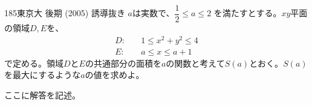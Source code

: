 \begin{thm}{185}{}{東京大 後期 (2005) 誘導抜き}
 $a$は実数で、$\dfrac{1}{2}\le a\le 2$ を満たすとする。$xy$平面の領域$D, E$を、
 \begin{align*}
  D:&\quad 1\le x^2+y^2 \le 4 \\
  E:&\quad a\le x \le a+1
 \end{align*}
 で定める。領域$D$と$E$の共通部分の面積を$a$の関数と考えて$S(a)$とおく。$S(a)$を最大にするような$a$の値を求めよ。
\end{thm}

ここに解答を記述。